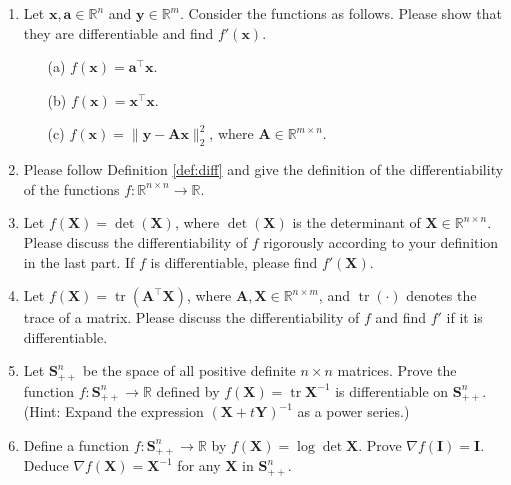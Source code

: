 \documentclass[11pt,letter,notitlepage]{article}
\newcommand{\tr}{ \operatorname{tr}  }
\theoremstyle{definition}
\begin{document}
\begin{exercise}
		\begin{enumerate}
			\item 	Let $\mathbf{x},\mathbf{a}\in \mathbb{R}^n$ and $\mathbf{y}\in \mathbb{R}^m$. Consider the functions as follows. Please show that they are differentiable and find $f'(\mathbf{x})$.
			\begin{enumerate}
				\item[(a)] $f(\mathbf{x}) = \mathbf{a}^{\top}\mathbf{x}$.
				\item[(b)] $f(\mathbf{x}) = \mathbf{x}^{\top}\mathbf{x}$.
				\item[(c)] $f(\mathbf{x})=\| \mathbf{y} - \mathbf{A}\mathbf{x} \|_2^2$, where $\mathbf{A}\in\mathbb{R}^{m\times n}$.
			\end{enumerate}
			\item Please follow Definition \ref{def:diff} and give the definition of the differentiability of the functions $f:\mathbb{R}^{n\times n}\rightarrow\mathbb{R}$.
			\item Let $f(\mathbf{X}) = \det(\mathbf{X})$, where $\det(\mathbf{X})$ is the determinant of $\mathbf{X} \in \mathbb{R}^{n \times n}$. Please discuss the differentiability of $f$ rigorously according to your definition in the last part. If $f$ is differentiable, please find $f'(\mathbf{X})$. 
			\item Let $f(\mathbf{X})=\tr(\mathbf{A}^{\top}\mathbf{X})$, where $\mathbf{A},\mathbf{X}\in\mathbb{R}^{n\times m}$, and $\tr(\cdot)$ denotes the trace of a matrix. Please discuss the differentiability of $f$ and find $f'$ if it is differentiable.
			\item Let $\mathbf{S}_{++}^n$ be the space of all positive definite $n\times n$ matrices. Prove the function $f: \mathbf{S}_{++}^{n} \rightarrow \mathbb{R}$ defined by $f(\mathbf{X})=\tr{\mathbf{X}^{-1}}$ is differentiable on $ \mathbf{S}_{++}^{n} $. (Hint: Expand the expression $(\mathbf{X}+t\mathbf{Y})^{-1}$ as a power series.)
            \item Define a function $ f: \mathbf{S}_{++}^{n}\to\mathbb{R} $ by $f(\mathbf{X})=\log\det{\mathbf{X}}$. Prove $\nabla{f(\mathbf{I})=\mathbf{I}}$. Deduce $\nabla{f(\mathbf{X})=\mathbf{X}^{-1}}$ for any $\mathbf{X}$ in $\mathbf{S}^n_{++}$.
		\end{enumerate}
		
	\end{exercise}
	
\end{document}
